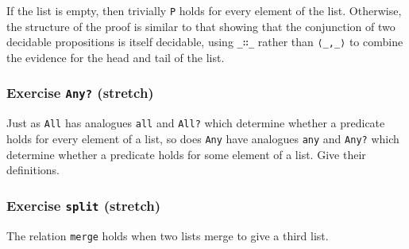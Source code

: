 If the list is empty, then trivially \texttt{P} holds for every element
of the list. Otherwise, the structure of the proof is similar to that
showing that the conjunction of two decidable propositions is itself
decidable, using \texttt{\_∷\_} rather than \texttt{⟨\_,\_⟩} to combine
the evidence for the head and tail of the list.

\hypertarget{exercise-any-stretch}{%
\subsubsection{\texorpdfstring{Exercise \texttt{Any?}
(stretch)}{Exercise Any? (stretch)}}\label{exercise-any-stretch}}

Just as \texttt{All} has analogues \texttt{all} and \texttt{All?} which
determine whether a predicate holds for every element of a list, so does
\texttt{Any} have analogues \texttt{any} and \texttt{Any?} which
determine whether a predicate holds for some element of a list. Give
their definitions.

\begin{fence}
\begin{code}%
\>[0]\<%
\end{code}
\end{fence}

\hypertarget{exercise-split-stretch}{%
\subsubsection{\texorpdfstring{Exercise \texttt{split}
(stretch)}{Exercise split (stretch)}}\label{exercise-split-stretch}}

The relation \texttt{merge} holds when two lists merge to give a third
list.

